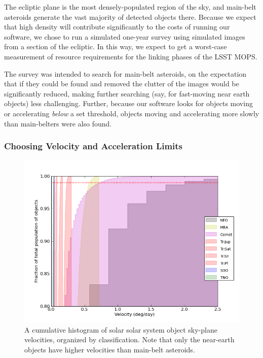\documentclass[12pt,preprint]{aastex}
\begin{document}
The ecliptic plane is the most densely-populated region of the sky,
and main-belt asteroids generate the vast majority of detected objects
there.  Because we expect that high density will contribute
significantly to the costs of running our software, we chose to run a
simulated one-year survey using simulated images from a section of the ecliptic.
In this way, we expect to get a worst-case measurement of resource
requirements for the linking phases of the LSST MOPS.

The survey was intended to search for main-belt asteroids, on the
expectation that if they could be found and removed the clutter of the
images would be significantly reduced, making further searching (say,
for fast-moving near earth objects) less challenging.  Further,
because our software looks for objects moving or accelerating
\textit{below} a set threshold, objects moving and accelerating more
slowly than main-belters were also found.

\subsubsection{Choosing Velocity and Acceleration Limits}

\begin{figure}[ht!]
  \begin{centering}
  \includegraphics[width=13cm]{illustrations/mopsplots/findtracklets_vel1.png}
  \end{centering}
  \label{velSurvey}
  \caption{A cumulative histogram of solar solar system object sky-plane velocities, organized by classification.  Note that only the near-earth objects have higher velocities than main-belt asteroids.}
\end{figure}
\end{document}
